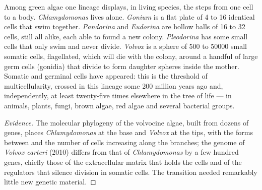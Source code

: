 \begin{proposition}\label{prop:b2:unicellular-diversity:volvox}
Among green algae one lineage displays, in living species, the steps
from one cell to a body. \emph{Chlamydomonas} lives alone.
\emph{Gonium} is a flat plate of 4 to 16 identical cells that swim
together. \emph{Pandorina} and \emph{Eudorina} are hollow balls of 16
to 32 cells, still all alike, each able to found a new colony.
\emph{Pleodorina} has some small cells that only swim and never
divide. \emph{Volvox} is a sphere of \num{500} to \num{50000} small
somatic cells, flagellated, which will die with the colony, around a
handful of large germ cells (gonidia) that divide to form daughter
spheres inside the mother. Somatic and germinal cells have appeared:
this is the threshold of multicellularity, crossed in this lineage
some \num{200} million years ago and, independently, at least
twenty-five times elsewhere in the tree of life --- in animals,
plants, fungi, brown algae, red algae and several bacterial groups.
\end{proposition}
\begin{proof}[Evidence]
The molecular phylogeny of the volvocine algae, built from dozens of
genes, places \emph{Chlamydomonas} at the base and \emph{Volvox}
at the tips, with the  forms between and the number of cells
increasing along the branches; the genome of \emph{Volvox carteri}
(2010) differs from that of \emph{Chlamydomonas} by a few hundred
genes, chiefly those of the extracellular matrix that holds the cells
and of the regulators that silence division in somatic cells. The
transition needed remarkably little new genetic material.
\end{proof}

